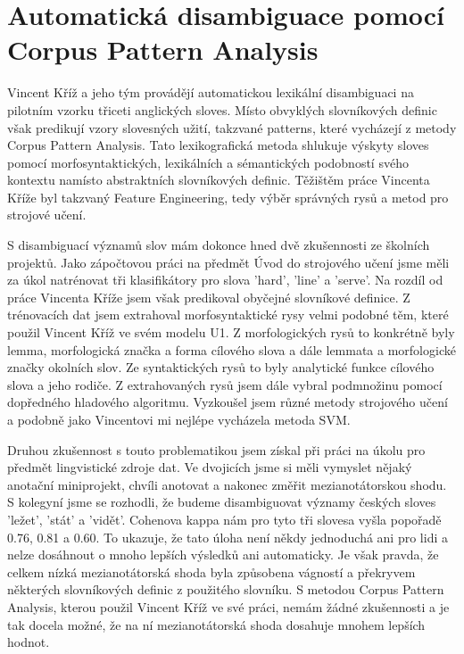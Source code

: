 \documentclass[12pt,a4paper]{report}
\begin{document}
\section*{Automatická disambiguace pomocí Corpus Pattern Analysis}

Vincent Kříž a jeho tým provádějí automatickou lexikální disambiguaci na
pilotním vzorku třiceti anglických sloves. Místo obvyklých slovníkových definic
však predikují vzory slovesných užití, takzvané patterns, které vycházejí z
metody Corpus Pattern Analysis. Tato lexikografická metoda shlukuje výskyty
sloves pomocí morfosyntaktických, lexikálních a sémantických podobností svého
kontextu namísto abstraktních slovníkových definic. Těžištěm práce Vincenta
Kříže byl takzvaný Feature Engineering, tedy výběr správných rysů a metod pro
strojové učení.


S disambiguací významů slov mám dokonce hned dvě zkušennosti ze školních
projektů.  Jako zápočtovou práci na předmět Úvod do strojového učení jsme měli
za úkol natrénovat tři klasifikátory pro slova 'hard', 'line' a 'serve'. Na
rozdíl od práce Vincenta Kříže jsem však predikoval obyčejné slovníkové
definice.  Z trénovacích dat jsem extrahoval morfosyntaktické rysy velmi
podobné těm, které použil Vincent Kříž ve svém modelu U1. Z morfologických rysů
to konkrétně byly lemma, morfologická značka a forma cílového slova a dále
lemmata a morfologické značky okolních slov.  Ze syntaktických rysů to byly
analytické funkce cílového slova a jeho rodiče. Z extrahovaných rysů jsem dále
vybral podmnožinu pomocí dopředného hladového algoritmu. Vyzkoušel jsem různé
metody strojového učení a podobně jako Vincentovi mi nejlépe vycházela metoda
SVM.

Druhou zkušennost s touto problematikou jsem získal při práci na úkolu pro
předmět lingvistické zdroje dat. Ve dvojicích jsme si měli vymyslet nějaký
anotační miniprojekt, chvíli anotovat a nakonec změřit mezianotátorskou shodu.
S kolegyní jsme se rozhodli, že budeme disambiguovat významy českých sloves
'ležet', 'stát' a 'vidět'. Cohenova kappa nám pro tyto tři slovesa vyšla
popořadě 0.76, 0.81 a 0.60.  To ukazuje, že tato úloha není někdy jednoduchá
ani pro lidi a nelze dosáhnout o mnoho lepších výsledků ani automaticky. Je
však pravda, že celkem nízká mezianotátorská shoda byla způsobena vágností a
překryvem některých slovníkových definic z použitého slovníku. S metodou Corpus
Pattern Analysis, kterou použil Vincent Kříž ve své práci, nemám žádné
zkušennosti a je tak docela možné, že na ní mezianotátorská shoda dosahuje
mnohem lepších hodnot.
\end{document}
